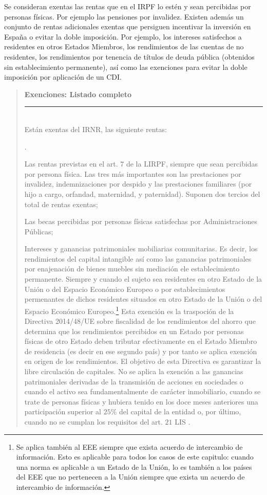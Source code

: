 \documentclass[10pt,a4paper]{article}
\newcounter{numitem}
\newenvironment{lnum}
      {\begin{list}{\arabic{numitem}.}{%
          \usecounter{numitem}%
          \setlength{\leftmargin}{1cm}%
          \setlength{\parskip}{3pt}%
          \setlength{\itemsep}{0pt}%
          \setlength{\parsep}{0pt}%
      }}
      {\end{list}}
\newenvironment{specialblock}[1]{%
      \begin{quote} %
      \small %
      \noindent\textbf{#1}\\[-0.3em] %
      \rule{\linewidth}{0.4pt}\\[0.6em]}{
      \end{quote}}
\begin{document}
Se consideran exentas las rentas que en el IRPF lo estén y sean percibidas por personas físicas. Por ejemplo las pensiones por invalidez. Existen además un conjunto de rentas adicionales exentas que persiguen incentivar la inversión en España o evitar la doble imposición. Por ejemplo, los intereses satisfechos a residentes en otros Estados Miembros, los rendimientos de las cuentas de no residentes, los rendimientos por tenencia de títulos de deuda pública (obtenidos sin establecimiento permanente), así como las exenciones para evitar la doble imposición por aplicación de un CDI.

\begin{specialblock}{\textbf{Exenciones:} Listado completo}
    Están exentas del IRNR, las siguiente rentas:
    \begin{lnum}
        \item Las rentas previstas en el art. $7$ de la LIRPF, siempre que sean percibidas por persona física. Las tres más importantes son las prestaciones por invalidez, indemnizaciones por despido y las prestaciones familiares (por hijo a cargo, orfandad, maternidad, y paternidad). Suponen dos tercios del total de rentas exentas;
        \item Las becas percibidas por personas físicas satisfechas por Administraciones Públicas;
        \item Intereses y ganancias patrimoniales mobiliarias comunitarias. Es decir, los rendimientos del capital intangible así como las ganancias patrimoniales por enajenación de bienes muebles sin mediación ele establecimiento permanente. Siempre y cuando el sujeto sea residentes en otro Estado de la Unión o del Espacio Económico Europeo o por establecimientos permenantes de dichos residentes situados en otro Estado de la Unión o del Espacio Económico Europeo.\footnote{%
            Se aplica también al EEE siempre que exista acuerdo de intercambio de información. Esto es aplicable para todos los casos de este capitulo: cuando una norma es aplicable a un Estado de la Unión, lo es también a los países del EEE que no pertenecen a la Unión siempre que exista un acuerdo de intercambio de información.
        } Esta exención es la traspoción de la Directiva 2014/48/UE sobre fiscalidad de los rendimientos del ahorro que determina que los rendimientos percibidos en un Estado por personas físicas de otro Estado deben tributar efectivamente en el Estado Miembro de residencia (es decir en ese segundo país) y por tanto se aplica exención en origen de los rendimientos. El objetivo de esta Directiva es garantizar la libre circulación de capitales. No se aplica la exención a las ganancias patrimoniales derivadas de la transmisión de acciones en sociedades o cuando el activo sea fundamentalmente de carácter inmobiliario, cuando se trate de personas físicas y hubiera tenido en los doce meses anteriores una participación superior al $25\%$ del capital de la entidad o, por último, cuando no se cumplan los requisitos del art. $21$ LIS .

\end{lnum}
\end{specialblock}
\end{document}
